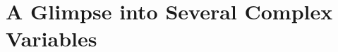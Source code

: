 \documentclass[../../main.tex]{subfiles}
\begin{document}
\chapter{A Glimpse into Several Complex Variables}
\end{document}
